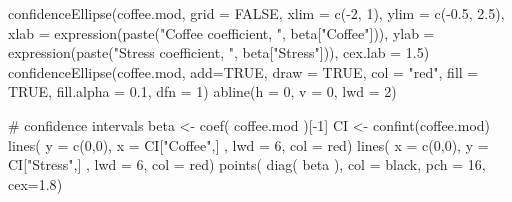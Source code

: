 \documentclass[
  letterpaper,
  10pt,
  krantz2]{krantz}
\makeatletter
\newenvironment{Shaded}{\begin{snugshade}}{\end{snugshade}}
\newcommand{\AttributeTok}[1]{\textcolor[rgb]{0.40,0.45,0.13}{#1}}
\newcommand{\CommentTok}[1]{\textcolor[rgb]{0.37,0.37,0.37}{#1}}
\newcommand{\ConstantTok}[1]{\textcolor[rgb]{0.56,0.35,0.01}{#1}}
\newcommand{\DecValTok}[1]{\textcolor[rgb]{0.68,0.00,0.00}{#1}}
\newcommand{\FloatTok}[1]{\textcolor[rgb]{0.68,0.00,0.00}{#1}}
\newcommand{\FunctionTok}[1]{\textcolor[rgb]{0.28,0.35,0.67}{#1}}
\newcommand{\NormalTok}[1]{\textcolor[rgb]{0.00,0.23,0.31}{#1}}
\newcommand{\OtherTok}[1]{\textcolor[rgb]{0.00,0.23,0.31}{#1}}
\newcommand{\SpecialCharTok}[1]{\textcolor[rgb]{0.37,0.37,0.37}{#1}}
\newcommand{\StringTok}[1]{\textcolor[rgb]{0.13,0.47,0.30}{#1}}
\newenvironment{kframe}{%
  \medskip{}
  \setlength{\fboxsep}{.8em}
  \def\at@end@of@kframe{}%
  \ifinner\ifhmode%
  \def\at@end@of@kframe{\end{minipage}}%
  \begin{minipage}{\columnwidth}%
  \fi\fi%
  \def\FrameCommand##1{\hskip\@totalleftmargin \hskip-\fboxsep
  \colorbox{shadecolor}{##1}\hskip-\fboxsep
      \hskip-\linewidth \hskip-\@totalleftmargin \hskip\columnwidth}%
  \MakeFramed {\advance\hsize-\width
    \@totalleftmargin\z@ \linewidth\hsize
    \@setminipage}}%
{\par\unskip\endMakeFramed%
  \at@end@of@kframe}
\renewenvironment{Shaded}{\begin{kframe}}{\end{kframe}}
\makeatother
\begin{document}
\begin{Shaded}
\begin{Highlighting}[]
\FunctionTok{confidenceEllipse}\NormalTok{(coffee.mod, }
    \AttributeTok{grid =} \ConstantTok{FALSE}\NormalTok{,}
    \AttributeTok{xlim =} \FunctionTok{c}\NormalTok{(}\SpecialCharTok{{-}}\DecValTok{2}\NormalTok{, }\DecValTok{1}\NormalTok{), }\AttributeTok{ylim =} \FunctionTok{c}\NormalTok{(}\SpecialCharTok{{-}}\FloatTok{0.5}\NormalTok{, }\FloatTok{2.5}\NormalTok{),}
    \AttributeTok{xlab =} \FunctionTok{expression}\NormalTok{(}\FunctionTok{paste}\NormalTok{(}\StringTok{"Coffee coefficient,  "}\NormalTok{, beta[}\StringTok{"Coffee"}\NormalTok{])),}
    \AttributeTok{ylab =} \FunctionTok{expression}\NormalTok{(}\FunctionTok{paste}\NormalTok{(}\StringTok{"Stress coefficient,  "}\NormalTok{, beta[}\StringTok{"Stress"}\NormalTok{])),}
    \AttributeTok{cex.lab =} \FloatTok{1.5}\NormalTok{)}
\FunctionTok{confidenceEllipse}\NormalTok{(coffee.mod, }\AttributeTok{add=}\ConstantTok{TRUE}\NormalTok{, }\AttributeTok{draw =} \ConstantTok{TRUE}\NormalTok{,}
    \AttributeTok{col =} \StringTok{"red"}\NormalTok{, }\AttributeTok{fill =} \ConstantTok{TRUE}\NormalTok{, }\AttributeTok{fill.alpha =} \FloatTok{0.1}\NormalTok{,}
    \AttributeTok{dfn =} \DecValTok{1}\NormalTok{)}
\FunctionTok{abline}\NormalTok{(}\AttributeTok{h =} \DecValTok{0}\NormalTok{, }\AttributeTok{v =} \DecValTok{0}\NormalTok{, }\AttributeTok{lwd =} \DecValTok{2}\NormalTok{)}

\CommentTok{\# confidence intervals}
\NormalTok{beta }\OtherTok{\textless{}{-}} \FunctionTok{coef}\NormalTok{( coffee.mod )[}\SpecialCharTok{{-}}\DecValTok{1}\NormalTok{]}
\NormalTok{CI }\OtherTok{\textless{}{-}} \FunctionTok{confint}\NormalTok{(coffee.mod)}
\FunctionTok{lines}\NormalTok{( }\AttributeTok{y =} \FunctionTok{c}\NormalTok{(}\DecValTok{0}\NormalTok{,}\DecValTok{0}\NormalTok{), }\AttributeTok{x =}\NormalTok{ CI[}\StringTok{"Coffee"}\NormalTok{,] , }\AttributeTok{lwd =} \DecValTok{6}\NormalTok{, }\AttributeTok{col =} \StringTok{\textquotesingle{}red\textquotesingle{}}\NormalTok{)}
\FunctionTok{lines}\NormalTok{( }\AttributeTok{x =} \FunctionTok{c}\NormalTok{(}\DecValTok{0}\NormalTok{,}\DecValTok{0}\NormalTok{), }\AttributeTok{y =}\NormalTok{ CI[}\StringTok{"Stress"}\NormalTok{,] , }\AttributeTok{lwd =} \DecValTok{6}\NormalTok{, }\AttributeTok{col =} \StringTok{\textquotesingle{}red\textquotesingle{}}\NormalTok{)}
\FunctionTok{points}\NormalTok{( }\FunctionTok{diag}\NormalTok{( beta ), }\AttributeTok{col =} \StringTok{\textquotesingle{}black\textquotesingle{}}\NormalTok{, }\AttributeTok{pch =} \DecValTok{16}\NormalTok{, }\AttributeTok{cex=}\FloatTok{1.8}\NormalTok{)}


\end{Highlighting}
\end{Shaded}
\end{document}
